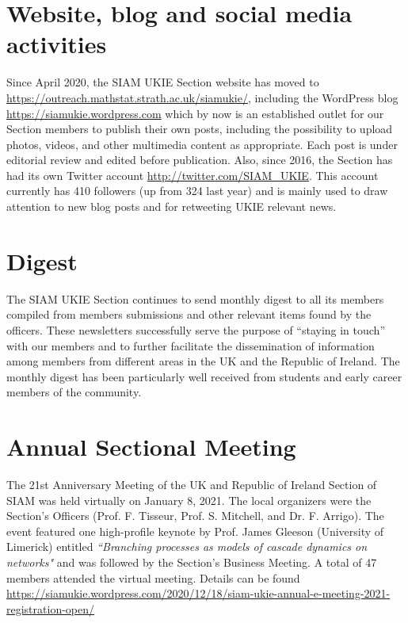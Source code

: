 \documentclass{article}
\begin{document}
\section*{Website, blog and social media activities}
Since April 2020, the SIAM UKIE Section website has moved to  
\url{https://outreach.mathstat.strath.ac.uk/siamukie/}, including the WordPress blog \url{https://siamukie.wordpress.com} which by now is an established outlet for our Section members to publish their own posts, including the possibility to upload photos, videos, and other multimedia content as appropriate. Each post is under editorial review and edited before publication. Also, since 2016, the Section has had its own Twitter account \url{http://twitter.com/SIAM_UKIE}. This account currently has 410 followers (up from 324 last year) and is mainly used to draw attention to new blog posts and for retweeting UKIE relevant news.

\section*{Digest}
The SIAM UKIE Section continues to send monthly digest to all its members compiled from members submissions and 
other relevant items found by the officers. 
These newsletters successfully serve the purpose of “staying in touch” with our
members and to further facilitate the dissemination of information among members from different
areas in the UK and the Republic of Ireland.
The monthly digest has been particularly well received from students and early career members of the community. 

\section*{Annual Sectional Meeting}
The 21st Anniversary Meeting of the UK and Republic of Ireland Section of SIAM was held virtually on 
January 8, 2021. 
The local organizers were the Section's Officers (Prof. F. Tisseur, Prof. S. Mitchell, and Dr. F. Arrigo). 
The event featured one high-profile keynote by Prof. James Gleeson (University of Limerick) entitled 
{\it ``Branching processes as models of cascade dynamics on networks"} and was followed by the Section's Business Meeting. 
A total of 47 members attended the virtual meeting. Details can be found \href{here}{https://siamukie.wordpress.com/2020/12/18/siam-ukie-annual-e-meeting-2021-registration-open/}
\end{document}
